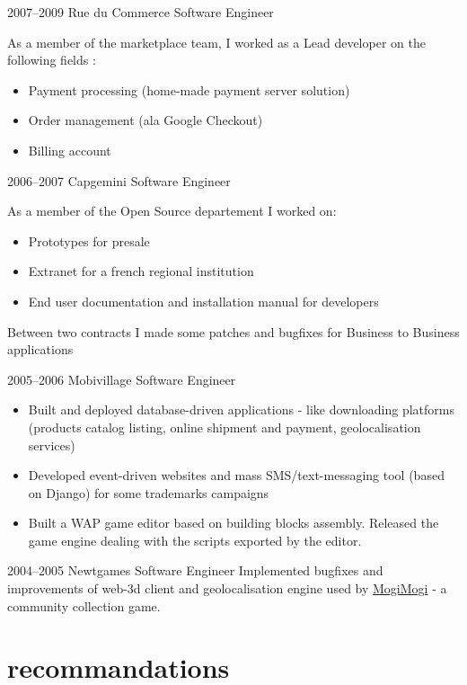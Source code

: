 \documentclass[]{friggeri-cv}
\begin{document}
\begin{entrylist}
  \entry
    {2007–2009}
    {Rue du Commerce}
    {Software Engineer}
    {As a member of the marketplace team, I worked as a Lead developer on the following fields :
    \begin{itemize}
    \item Payment processing (home-made payment server solution)
    \item Order management (ala Google Checkout)
    \item Billing account
    \end{itemize}}
  \entry
    {2006–2007}
    {Capgemini}
    {Software Engineer}
    {As a member of the Open Source departement I worked on:
    \begin{itemize}
    \item Prototypes for presale
    \item Extranet for a french regional institution
    \item End user documentation and installation manual for developers
    \end{itemize}
    Between two contracts I made some patches and bugfixes for Business to Business applications}
  \entry
    {2005–2006}
    {Mobivillage}
    {Software Engineer}
    {\begin{itemize}
    \item Built and deployed database-driven applications - like downloading platforms (products catalog listing, online shipment and payment, geolocalisation services)
    \item Developed event-driven websites and mass SMS/text-messaging tool (based on Django) for some trademarks campaigns
    \item Built a WAP game editor based on building blocks assembly. Released the game engine dealing with the scripts exported by the editor.
    \end{itemize}}
  \entry
    {2004–2005}
    {Newtgames}
    {Software Engineer}
    {Implemented bugfixes and improvements of web-3d client and geolocalisation engine used by \href{http://mogimogi.com}{MogiMogi} - a community collection game.}
\end{entrylist}

\clearpage

\section{recommandations}
\end{document}
